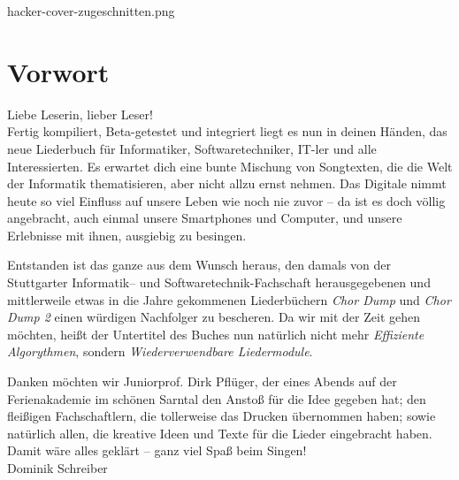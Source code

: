 \documentclass[11pt,a5paper]{article}
\def\maketitle{
		\vspace*{1.4cm}
			\begin{overpic}[width=11cm]{hacker-cover-zugeschnitten.png}
			\end{overpic}
		}
\begin{document}
			
	\maketitle
	\thispagestyle{empty}
	\pagebreak
	\tableofcontents
	\pagebreak
	
	\small
	
	\section*{Vorwort}
	
	Liebe Leserin, lieber Leser! \\
				
	Fertig kompiliert, Beta-getestet und integriert liegt es nun in deinen Händen, das neue Liederbuch für Informatiker, Softwaretechniker, IT-ler und alle Interessierten. 
	Es erwartet dich eine bunte Mischung von Songtexten, die die Welt der Informatik thematisieren, aber nicht allzu ernst nehmen. Das Digitale nimmt heute so viel Einfluss auf unsere Leben wie noch nie zuvor -- da ist es doch völlig angebracht, auch einmal unsere Smartphones und Computer, und unsere Erlebnisse mit ihnen, ausgiebig zu besingen.
	
	Entstanden ist das ganze aus dem Wunsch heraus, den damals von der Stuttgarter Informatik-- und Softwaretechnik-Fachschaft herausgegebenen und mittlerweile etwas in die Jahre gekommenen Liederbüchern \emph{Chor Dump} und \emph{Chor Dump 2} einen würdigen Nachfolger zu bescheren.
	Da wir mit der Zeit gehen möchten, heißt der Untertitel des Buches nun natürlich nicht mehr \emph{Effiziente Algorythmen}, sondern \emph{Wiederverwendbare Liedermodule}.
	
	Danken möchten wir Juniorprof. Dirk Pflüger, der eines Abends auf der Ferienakademie im schönen Sarntal den Anstoß für die Idee gegeben hat; den fleißigen Fachschaftlern, die tollerweise das Drucken übernommen haben; sowie natürlich allen, die kreative Ideen und Texte für die Lieder eingebracht haben. \\
	
	Damit wäre alles geklärt -- ganz viel Spaß beim Singen! \\
	
	\hfill Dominik Schreiber
	
	\pagebreak
	
\end{document}
